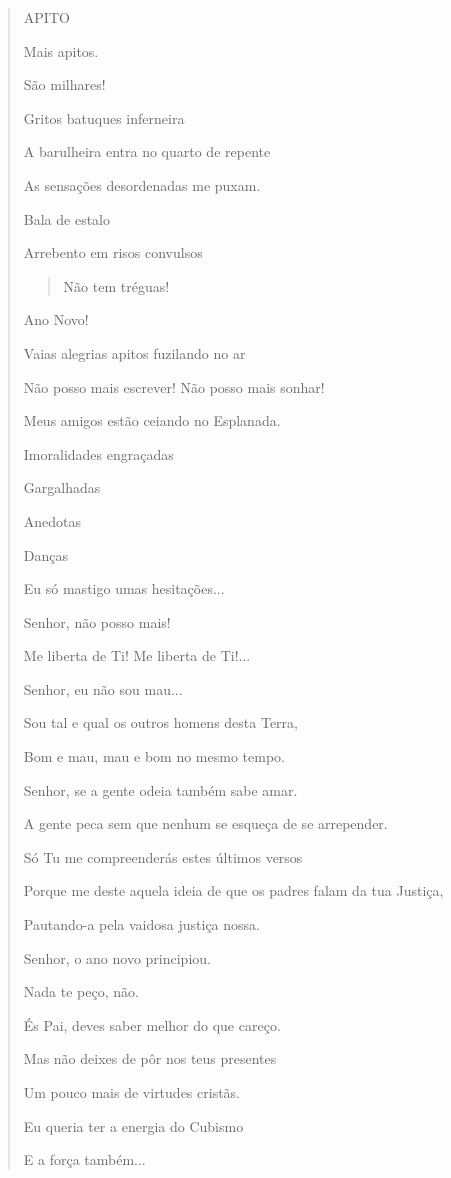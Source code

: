 \begin{verse}
APITO

Mais apitos.

São milhares!

Gritos batuques inferneira

A barulheira entra no quarto de repente

As sensações desordenadas me puxam.

Bala de estalo

Arrebento em risos convulsos

\begin{quote}
Não tem tréguas!
\end{quote}

Ano Novo!

Vaias alegrias apitos fuzilando no ar

Não posso mais escrever! Não posso mais sonhar!

Meus amigos estão ceiando no Esplanada.

Imoralidades engraçadas

Gargalhadas

Anedotas

Danças

Eu só mastigo umas hesitações...

Senhor, não posso mais!

Me liberta de Ti! Me liberta de Ti!...

Senhor, eu não sou mau...

Sou tal e qual os outros homens desta Terra,

Bom e mau, mau e bom no mesmo tempo.

Senhor, se a gente odeia também sabe amar.

A gente peca sem que nenhum se esqueça de se arrepender.

Só Tu me compreenderás estes últimos versos

Porque me deste aquela ideia de que os padres falam da tua Justiça,

Pautando-a pela vaidosa justiça nossa.

Senhor, o ano novo principiou.

Nada te peço, não.

És Pai, deves saber melhor do que careço.

Mas não deixes de pôr nos teus presentes

Um pouco mais de virtudes cristãs.

Eu queria ter a energia do Cubismo

E a força também...


\end{verse}
